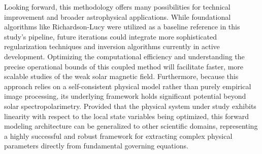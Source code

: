 Looking forward, this methodology offers many possibilities for technical improvement and broader astrophysical applications. While foundational algorithms like Richardson-Lucy were utilized as a baseline reference in this study's pipeline, future iterations could integrate more sophisticated regularization techniques and inversion algorithms currently in active development. Optimizing the computational efficiency and understanding the precise operational bounds of this coupled method will facilitate faster, more scalable studies of the weak solar magnetic field. Furthermore, because this approach relies on a self-consistent physical model rather than purely empirical image processing, its underlying framework holds significant potential beyond solar spectropolarimetry. Provided that the physical system under study exhibits linearity with respect to the local state variables being optimized, this forward modeling architecture can be generalized to other scientific domains, representing a highly successful and robust framework for extracting complex physical parameters directly from fundamental governing equations.